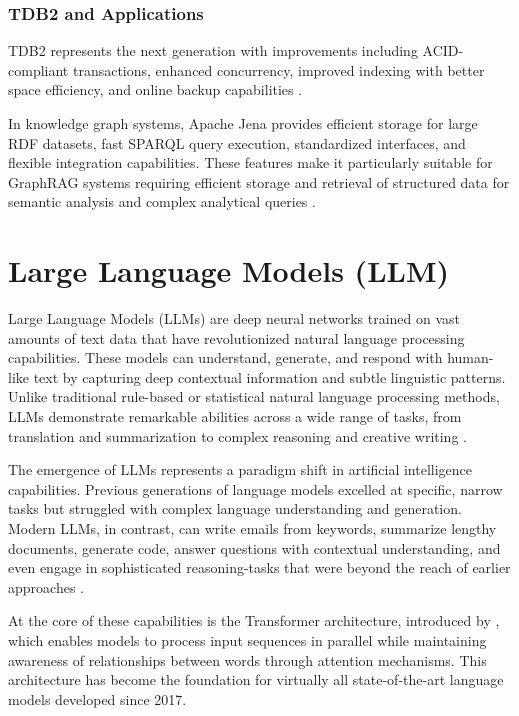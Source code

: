 \subsubsection{TDB2 and Applications}
\label{sec:tdb2}
TDB2 represents the next generation with improvements including ACID-compliant transactions, enhanced concurrency, improved indexing with better space efficiency, and online backup capabilities \citep{jena2023tdb2}.

In knowledge graph systems, Apache Jena provides efficient storage for large RDF datasets, fast SPARQL query execution, standardized interfaces, and flexible integration capabilities. These features make it particularly suitable for GraphRAG systems requiring efficient storage and retrieval of structured data for semantic analysis and complex analytical queries \citep{wilcke2017knowledge}.
\section{Large Language Models (LLM)}
\label{sec:llm}
Large Language Models (LLMs) are deep neural networks trained on vast amounts of text data that have revolutionized natural language processing capabilities. These models can understand, generate, and respond with human-like text by capturing deep contextual information and subtle linguistic patterns. Unlike traditional rule-based or statistical natural language processing methods, LLMs demonstrate remarkable abilities across a wide range of tasks, from translation and summarization to complex reasoning and creative writing \citep{raschka2024build}.

The emergence of LLMs represents a paradigm shift in artificial intelligence capabilities. Previous generations of language models excelled at specific, narrow tasks but struggled with complex language understanding and generation. Modern LLMs, in contrast, can write emails from keywords, summarize lengthy documents, generate code, answer questions with contextual understanding, and even engage in sophisticated reasoning-tasks that were beyond the reach of earlier approaches \citep{raschka2024build}.

At the core of these capabilities is the Transformer architecture, introduced by \cite{vaswani2023attentionneed}, which enables models to process input sequences in parallel while maintaining awareness of relationships between words through attention mechanisms. This architecture has become the foundation for virtually all state-of-the-art language models developed since 2017.

